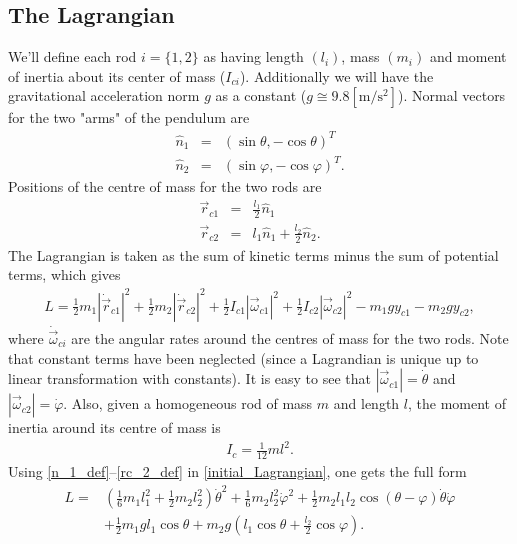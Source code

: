 \documentclass[a4paper]{article}
\begin{document}
	\subsection{The Lagrangian}\label{Lagrangian_subsection}
	We'll define each rod $ i = \{ 1 , 2 \} $ as having length $(l_i)$, mass $(m_i)$ and moment of inertia about its center of mass ($I_{c i}$).
	Additionally we will have the gravitational acceleration norm $g$ as a constant ($g \cong 9.8 [\mathrm{m/s^2}]$).
	Normal vectors for the two "arms" of the pendulum are 
	\begin{eqnarray}\label{n_1_def}
		\hat{n}_1 &=& ( \sin{ \theta } , -\cos{ \theta } )^T \\ \label{n_2_def}
		\hat{n}_2 &=& ( \sin{ \varphi } , - \cos{ \varphi } )^T.
	\end{eqnarray}
	Positions of the centre of mass for the two rods are
	\begin{eqnarray}\label{rc_1_def}
		\vec{r}_{c1} &=& \frac{ l_1 }{ 2 }\hat{n}_1 \\ \label{rc_2_def}
		\vec{r}_{c2} &=& l_1 \hat{n}_1 + \frac{ l_2 }{ 2 }\hat{n}_2.
	\end{eqnarray}
	The Lagrangian is taken as the sum of kinetic terms minus the sum of potential terms, which gives
	\begin{eqnarray}\label{initial_Lagrangian}
		L = \frac{1}{2}m_1 |\dot{\vec{r}}_{c1}|^2 + \frac{1}{2}m_2 |\dot{\vec{r}}_{c2}|^2 + \frac{1}{2}I_{c1} |\vec{\omega}_{c1}|^2 + \frac{1}{2}I_{c2} |\vec{\omega}_{c2}|^2 - m_1 g y_{c1} - m_2 g y_{c2}, 
	\end{eqnarray}
	where $\dot{\vec{\omega}}_{ci}$ are the angular rates around the centres of mass for the two rods.
	Note that constant terms have been neglected (since a Lagrandian is unique up to linear transformation with constants).
	It is easy to see that $|\vec{\omega}_{c1}| = \dot{\theta}$ and $|\vec{\omega}_{c2}| = \dot{\varphi}$.
	Also, given a homogeneous rod of mass $m$ and length $l$, the moment of inertia around its centre of mass is 
	\begin{eqnarray}
		I_c = \frac{1}{12}m l^2.
	\end{eqnarray}
	Using \eqref{n_1_def}--\eqref{rc_2_def} in \eqref{initial_Lagrangian}, one gets the full form
	\begin{eqnarray}\label{full_form_Lagrangian}
		L =& \left( \frac{1}{6}m_1 l_1^2 + \frac{1}{2}m_2 l_2^2 \right) \dot{\theta}^2 + \frac{1}{6}m_2 l_2^2 \dot{\varphi}^2 + \frac{1}{2}m_2 l_1 l_2 \cos( \theta - \varphi ) \dot{\theta} \dot{\varphi} \\ \nonumber
		& + \frac{1}{2}m_1 g l_1 \cos{\theta} + m_2 g \left( l_1 \cos{\theta} + \frac{l_2}{2} \cos{\varphi} \right).
	\end{eqnarray}
\end{document}
